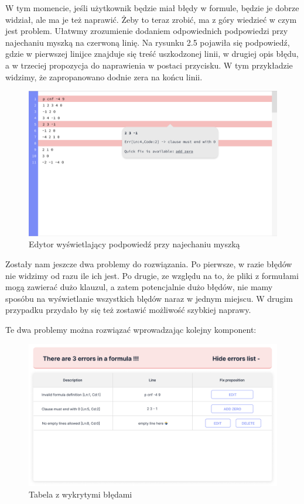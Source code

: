 \documentclass[a4paper,12pt,oneside]{book}
\theoremstyle{definition}
\begin{document}
W tym momencie, jeśli użytkownik będzie miał błędy w formule, będzie je dobrze widział, ale ma je też naprawić. Żeby to teraz zrobić, ma z góry wiedzieć w czym jest problem. Ułatwmy zrozumienie dodaniem odpowiednich podpowiedzi przy najechaniu myszką na czerwoną linię. Na rysunku 2.5 pojawiła się podpowiedź, gdzie w pierwszej linijce znajduje się treść uszkodzonej linii, w drugiej opis błędu, a w trzeciej propozycja do naprawienia w postaci przycisku. W tym przykładzie widzimy, że zapropanowano dodnie zera na końcu linii.

\begin{figure}[ht]
    \centering
    \includegraphics[width=14.30cm]{5}
    \caption{Edytor wyświetlający podpowiedź przy najechaniu myszką}
    \label{fig:5}
\end{figure}

\newpage

Zostały nam jeszcze dwa problemy do rozwiązania. Po pierwsze, w razie błędów nie widzimy od razu ile ich jest. Po drugie, ze względu na to, że pliki z formułami mogą zawierać dużo klauzul, a zatem potencjalnie dużo błędów, nie mamy sposóbu na wyświetlanie wszystkich blędów naraz w jednym miejscu. W drugim przypadku przydało by się też zostawić możliwość szybkiej naprawy. 

Te dwa problemy można rozwiązać wprowadzając kolejny komponent: 

\begin{figure}[ht]
    \centering
    \includegraphics[width=14.30cm]{6}
    \caption{Tabela z wykrytymi błędami}
    \label{fig:6}
\end{figure}
\end{document}
